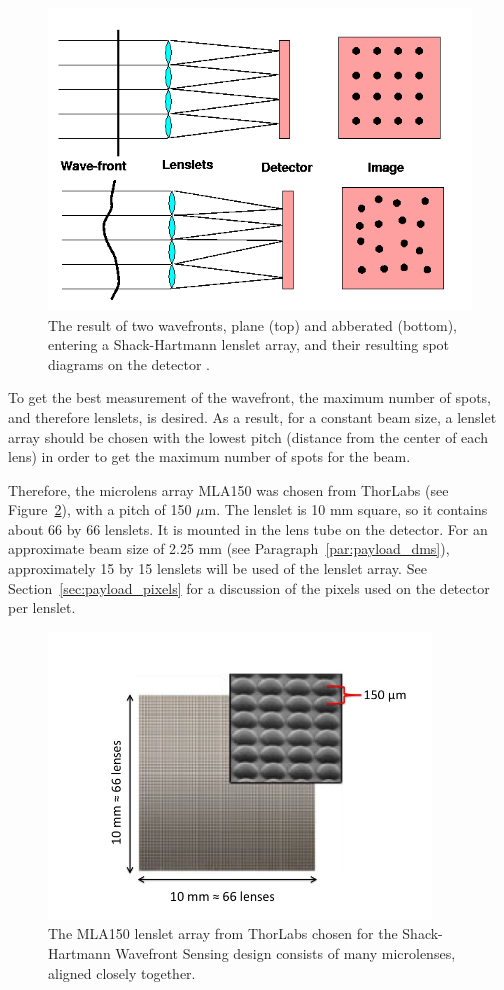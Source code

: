 \documentclass[12pt]{article}
\begin{document}
\begin{figure}[ht]
\centering
  \includegraphics[width=5in]{images/payload_SH.png}
\caption{The result of two wavefronts, plane (top)
  and abberated (bottom), entering a Shack-Hartmann lenslet array, and their
  resulting spot diagrams on the detector \cite{ctio_AO}.}
\label{fig:lenslet_array}
\end{figure}

To get the best measurement of the wavefront, the maximum number of spots, and therefore lenslets, is desired. As a result, for a constant beam size, a lenslet array should be chosen with the lowest pitch (distance from the center of each lens) in order to get the maximum number of spots for the beam. 

Therefore, the microlens array MLA150 was chosen from ThorLabs \cite{MLA150} (see Figure~\ref{fig:MLA150}), with a pitch of 150 $\mu$m.
The lenslet is 10 mm square, so it contains about 66 by 66 lenslets. It is mounted in the lens tube on the detector. For an approximate beam size of 2.25 mm (see Paragraph~\ref{par:payload_dms}), approximately 15 by 15 lenslets will be used of the lenslet array.  See Section~\ref{sec:payload_pixels} for a discussion of the pixels used on the detector per lenslet.

\begin{figure}[ht]
\centering
  \includegraphics[width=4in]{images/payload_MLA.jpg}
\caption{The MLA150 lenslet array from ThorLabs \cite{MLA150} chosen for the Shack-Hartmann Wavefront Sensing design consists of many microlenses, aligned closely together.}
\label{fig:MLA150}
\end{figure}
\end{document}
